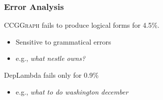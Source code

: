 \documentclass[mathserif,12pt]{beamer}
\newcommand \ccggraph{\textsc{CCGGraph}\xspace}
\begin{document}
\begin{frame}
\end{frame}

\begin{frame}
\frametitle{Error Analysis}
\large
 \ccggraph fails to produce logical forms for 4.5\%.
 \begin{itemize}
  \item Sensitive to grammatical errors
  \item e.g., \textsl{what nestle owns?}
 \end{itemize}  
 
 \vspace{2em}
 DepLambda fails only for 0.9\%
 \begin{itemize}
   \item e.g., \textsl{what to do washington december}
 \end{itemize}  
\end{frame}
\end{document}
